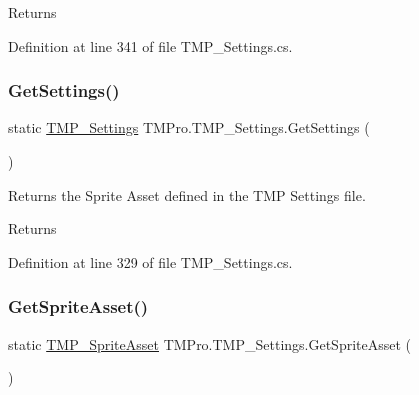 \begin{DoxyReturn}{Returns}

\end{DoxyReturn}


Definition at line 341 of file T\+M\+P\+\_\+\+Settings.\+cs.

\mbox{\label{class_t_m_pro_1_1_t_m_p___settings_a6bebbf1faa299871253f2c1517938c2a}} 
\subsubsection{\texorpdfstring{GetSettings()}{GetSettings()}}
{\footnotesize\ttfamily static \mbox{\hyperlink{class_t_m_pro_1_1_t_m_p___settings}{T\+M\+P\+\_\+\+Settings}} T\+M\+Pro.\+T\+M\+P\+\_\+\+Settings.\+Get\+Settings (\begin{DoxyParamCaption}{ }\end{DoxyParamCaption})\hspace{0.3cm}{\ttfamily [static]}}



Returns the Sprite Asset defined in the T\+MP Settings file. 

\begin{DoxyReturn}{Returns}

\end{DoxyReturn}


Definition at line 329 of file T\+M\+P\+\_\+\+Settings.\+cs.

\mbox{\label{class_t_m_pro_1_1_t_m_p___settings_a834d3c09ca86adf247e938f9eda8bd97}} 
\subsubsection{\texorpdfstring{GetSpriteAsset()}{GetSpriteAsset()}}
{\footnotesize\ttfamily static \mbox{\hyperlink{class_t_m_pro_1_1_t_m_p___sprite_asset}{T\+M\+P\+\_\+\+Sprite\+Asset}} T\+M\+Pro.\+T\+M\+P\+\_\+\+Settings.\+Get\+Sprite\+Asset (\begin{DoxyParamCaption}{ }\end{DoxyParamCaption})\hspace{0.3cm}{\ttfamily [static]}}



